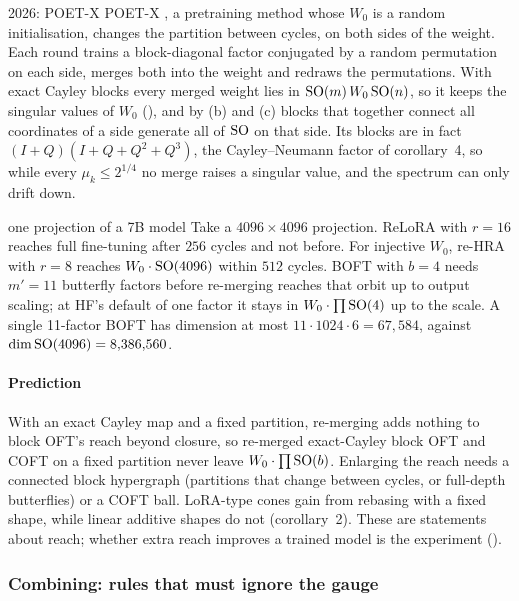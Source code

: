 \begin{remark*}{2026: POET-X}
POET-X \citep{qiu2026poet}, a pretraining method whose $W_0$ is a random initialisation, changes the partition between
cycles, on both sides of the weight. Each round trains a block-diagonal factor conjugated by a random permutation on
each side, merges both into the weight and redraws the permutations. With exact Cayley blocks every merged weight lies
in $\mathrm{SO}(m)\,W_0\,\mathrm{SO}(n)$, so it keeps the singular values of $W_0$ (), and by
(b) and (c) blocks that together connect all coordinates of a side generate all of $\mathrm{SO}$ on that
side. Its blocks are in fact $(I+Q)(I+Q+Q^2+Q^3)$, the Cayley--Neumann factor of corollary~4, so while every
$\mu_k\le2^{1/4}$ no merge raises a singular value, and the spectrum can only drift down.
\end{remark*}

\begin{example*}{one projection of a 7B model}
Take a $4096\times4096$ projection. ReLoRA with $r=16$ reaches full fine-tuning after $256$ cycles and not before. For
injective $W_0$, re-HRA with $r=8$ reaches $W_0\cdot\mathrm{SO}(4096)$ within $512$ cycles. BOFT with $b=4$ needs $m'=11$
butterfly factors before re-merging reaches that orbit up to output scaling; at HF's default of one factor it stays in
$W_0\cdot\prod\mathrm{SO}(4)$ up to the scale. A single 11-factor BOFT has dimension at most $11\cdot1024\cdot6=67{,}584$,
against $\dim\mathrm{SO}(4096)=8{,}386{,}560$.
\end{example*}

\paragraph{Prediction} With an exact Cayley map and a fixed partition, re-merging adds nothing to block OFT's reach
beyond closure, so re-merged exact-Cayley block OFT and COFT on a fixed partition never leave $W_0\cdot\prod\mathrm{SO}(b)$.
Enlarging the reach needs a connected block hypergraph (partitions that change between cycles, or full-depth
butterflies) or a COFT ball. LoRA-type cones gain from rebasing with a fixed shape, while linear additive shapes do not
(corollary~2). These are statements about reach; whether extra reach improves a trained model is the experiment
().

\subsubsection{Combining: rules that must ignore the gauge}\label{sec:base-combine}


